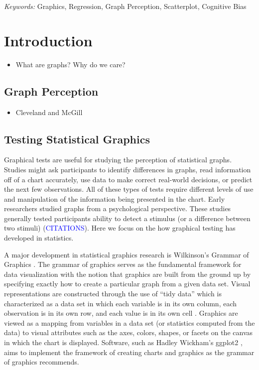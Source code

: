\documentclass[12pt]{article}
\providecommand{\tightlist}{%
  \setlength{\itemsep}{0pt}\setlength{\parskip}{0pt}}
\begin{document}
\noindent%
{\it Keywords:} Graphics, Regression, Graph
Perception, Scatterplot, Cognitive Bias
\vfill

\newpage
{} %

\hypertarget{introduction}{%
\section{Introduction}\label{introduction}}

\begin{itemize}
\tightlist
\item
  What are graphs? Why do we care?
\end{itemize}

\hypertarget{graph-perception}{%
\subsection{Graph Perception}\label{graph-perception}}

\begin{itemize}
\tightlist
\item
  Cleveland and McGill
\end{itemize}

\hypertarget{testing-statistical-graphics}{%
\subsection{Testing Statistical
Graphics}\label{testing-statistical-graphics}}

Graphical tests are useful for studying the perception of statistical
graphs. Studies might ask participants to identify differences in
graphs, read information off of a chart accurately, use data to make
correct real-world decisions, or predict the next few observations. All
of these types of tests require different levels of use and manipulation
of the information being presented in the chart. Early researchers
studied graphs from a psychological perspective. These studies generally
tested participants ability to detect a stimulus (or a difference
between two stimuli) ({\textcolor{blue}{CITATIONS}}). Here we focus on
the how graphical testing has developed in statistics.

A major development in statistical graphics research is Wilkinson's
Grammar of Graphics \citep{wilkinson2013grammar}. The grammar of
graphics serves as the fundamental framework for data visualization with
the notion that graphics are built from the ground up by specifying
exactly how to create a particular graph from a given data set. Visual
representations are constructed through the use of ``tidy data'' which
is characterized as a data set in which each variable is in its own
column, each observation is in its own row, and each value is in its own
cell \citep{wickham2016r}. Graphics are viewed as a mapping from
variables in a data set (or statistics computed from the data) to visual
attributes such as the axes, colors, shapes, or facets on the canvas in
which the chart is displayed. Software, such as Hadley Wickham's ggplot2
\citep{wickham2011ggplot2}, aims to implement the framework of creating
charts and graphics as the grammar of graphics recommends.
\end{document}
